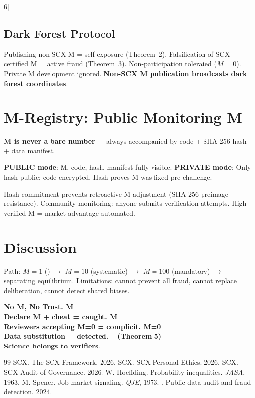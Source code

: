 6|\documentclass[12pt,a4paper]{article}
\begin{document}
\subsection{Dark Forest Protocol }
Publishing non-SCX M = self-exposure (Theorem~2). Falsification of SCX-certified M = active fraud (Theorem~3). Non-participation tolerated ($M=0$). Private M development ignored. \textbf{Non-SCX M publication broadcasts dark forest coordinates}.

\section{M-Registry: Public Monitoring M}
\label{sec:m-registry}
\textbf{M is never a bare number} — always accompanied by code + SHA-256 hash + data manifest.

\textbf{PUBLIC mode}: M, code, hash, manifest fully visible. \textbf{PRIVATE mode}: Only hash public; code encrypted. Hash proves M was fixed pre-challenge.

Hash commitment prevents retroactive M-adjustment (SHA-256 preimage resistance). Community monitoring: anyone submits verification attempts. High verified M = market advantage automated.

\section{Discussion — }
\label{sec:discussion}
Path: $M=1$ () $\to$ $M=10$ (systematic) $\to$ $M=100$ (mandatory) $\to$ separating equilibrium. Limitations: cannot prevent all fraud, cannot replace deliberation, cannot detect shared biases.

\begin{center}
\large\bfseries
No M, No Trust. M\\
Declare M + cheat = caught. M\\
Reviewers accepting M=0 = complicit. M=0\\
Data substitution = detected. =(Theorem 5)\\
Science belongs to verifiers. 
\end{center}

\begin{thebibliography}{99}
 SCX. The SCX Framework. 2026.
 SCX. SCX Personal Ethics. 2026.
 SCX. SCX Audit of Governance. 2026.
 W. Hoeffding. Probability inequalities. \emph{JASA}, 1963.
 M. Spence. Job market signaling. \emph{QJE}, 1973.
 . Public data audit and fraud detection. 2024.
\end{thebibliography}
\end{document}
